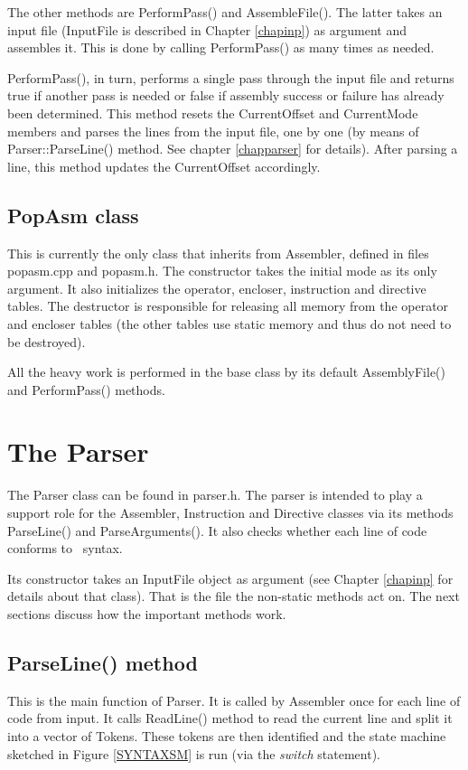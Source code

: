 \documentclass[a4paper,draft,12pt]{book}
\begin{document}
The other methods are PerformPass() and AssembleFile(). The latter takes an
input file (InputFile is described in Chapter \ref{chapinp}) as argument and
assembles it. This is done by calling PerformPass() as many times as needed.

PerformPass(), in turn, performs a single pass through the input file and
returns true if another pass is needed or false if assembly success or failure
has already been determined. This method resets the CurrentOffset and CurrentMode
members and parses the lines from the input file, one by one (by means of
Parser::ParseLine() method. See chapter \ref{chapparser} for details). After
parsing a line, this method updates the CurrentOffset accordingly.

\section{PopAsm class}
This is currently the only class that inherits from Assembler, defined in
files popasm.cpp and popasm.h. The constructor takes the initial mode as
its only argument. It also initializes the operator, encloser, instruction
and directive tables. The destructor is responsible for releasing all memory
from the operator and encloser tables (the other tables use static memory and
thus do not need to be destroyed).

All the heavy work is performed in the base class by its default AssemblyFile()
and PerformPass() methods.

\chapter{The Parser\label{chapparser}}
The Parser class can be found in parser.h. The parser is intended to play a
support role for the Assembler, Instruction and Directive classes via its
methods ParseLine() and ParseArguments(). It also checks whether each line
of code conforms to \popasm\ syntax.

Its constructor takes an InputFile object as argument (see Chapter \ref{chapinp}
for details about that class). That is the file the non-static methods act on.
The next sections discuss how the important methods work.

\section{ParseLine() method}
This is the main function of Parser. It is called by Assembler once for each line
of code from input. It calls ReadLine() method to read the current line and split
it into a vector of Tokens. These tokens are then identified and the state machine
sketched in Figure \ref{SYNTAXSM} is run (via the \emph{switch} statement).
\end{document}
